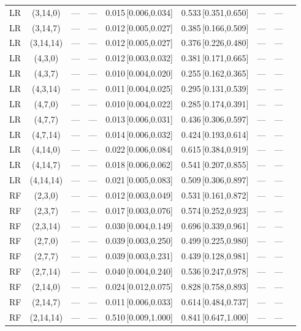 \begin{longtable}{lcccccccc}
LR & (3,14,0) & --- & --- & 0.015\,[0.006,0.034] & 0.533\,[0.351,0.650] & --- & --- \\
LR & (3,14,7) & --- & --- & 0.012\,[0.005,0.027] & 0.385\,[0.166,0.509] & --- & --- \\
LR & (3,14,14) & --- & --- & 0.012\,[0.005,0.027] & 0.376\,[0.226,0.480] & --- & --- \\
LR & (4,3,0) & --- & --- & 0.012\,[0.003,0.032] & 0.381\,[0.171,0.665] & --- & --- \\
LR & (4,3,7) & --- & --- & 0.010\,[0.004,0.020] & 0.255\,[0.162,0.365] & --- & --- \\
LR & (4,3,14) & --- & --- & 0.011\,[0.004,0.025] & 0.295\,[0.131,0.539] & --- & --- \\
LR & (4,7,0) & --- & --- & 0.010\,[0.004,0.022] & 0.285\,[0.174,0.391] & --- & --- \\
LR & (4,7,7) & --- & --- & 0.013\,[0.006,0.031] & 0.436\,[0.306,0.597] & --- & --- \\
LR & (4,7,14) & --- & --- & 0.014\,[0.006,0.032] & 0.424\,[0.193,0.614] & --- & --- \\
LR & (4,14,0) & --- & --- & 0.022\,[0.006,0.084] & 0.615\,[0.384,0.919] & --- & --- \\
LR & (4,14,7) & --- & --- & 0.018\,[0.006,0.062] & 0.541\,[0.207,0.855] & --- & --- \\
LR & (4,14,14) & --- & --- & 0.021\,[0.005,0.083] & 0.509\,[0.306,0.897] & --- & --- \\
RF & (2,3,0) & --- & --- & 0.012\,[0.003,0.049] & 0.531\,[0.161,0.872] & --- & --- \\
RF & (2,3,7) & --- & --- & 0.017\,[0.003,0.076] & 0.574\,[0.252,0.923] & --- & --- \\
RF & (2,3,14) & --- & --- & 0.030\,[0.004,0.149] & 0.696\,[0.339,0.961] & --- & --- \\
RF & (2,7,0) & --- & --- & 0.039\,[0.003,0.250] & 0.499\,[0.225,0.980] & --- & --- \\
RF & (2,7,7) & --- & --- & 0.039\,[0.003,0.231] & 0.439\,[0.128,0.981] & --- & --- \\
RF & (2,7,14) & --- & --- & 0.040\,[0.004,0.240] & 0.536\,[0.247,0.978] & --- & --- \\
RF & (2,14,0) & --- & --- & 0.024\,[0.012,0.075] & 0.828\,[0.758,0.893] & --- & --- \\
RF & (2,14,7) & --- & --- & 0.011\,[0.006,0.033] & 0.614\,[0.484,0.737] & --- & --- \\
RF & (2,14,14) & --- & --- & 0.510\,[0.009,1.000] & 0.841\,[0.647,1.000] & --- & --- \\

\end{longtable}
